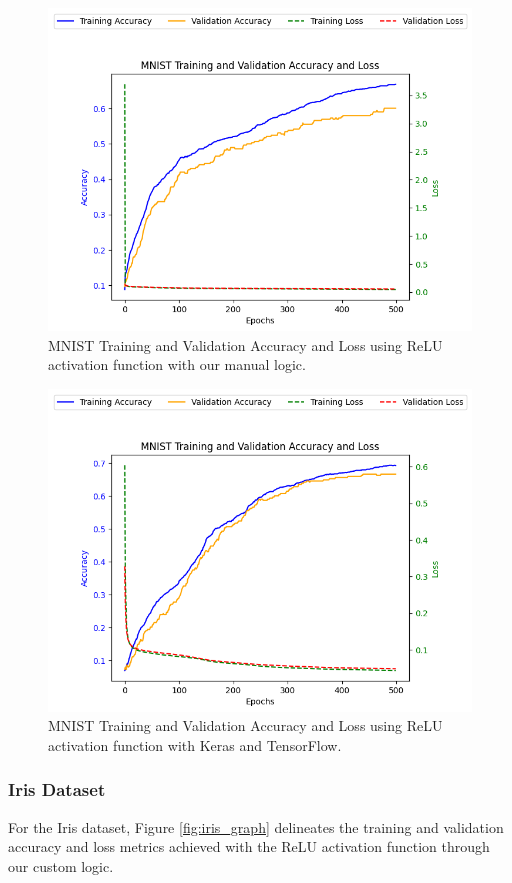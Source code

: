 \documentclass[letterpaper]{article}
\begin{document}
\begin{figure}[h]
    \centering
    \includegraphics[width=0.8\linewidth]{mnist_relu_custom.png} %
    \caption{MNIST Training and Validation Accuracy and Loss using ReLU activation function with our manual logic.}
    \label{fig:mnist_graph}
\end{figure}

\begin{figure}[h]
    \centering
    \includegraphics[width=0.8\linewidth]{mnist_relu_keras_tf.png} %
    \caption{MNIST Training and Validation Accuracy and Loss using ReLU activation function with Keras and TensorFlow.}
    \label{fig:mnist_keras_tf}
\end{figure}

\subsubsection{Iris Dataset}
For the Iris dataset, Figure \ref{fig:iris_graph} delineates the training and validation accuracy and loss metrics achieved with the ReLU activation function through our custom logic.
\end{document}
